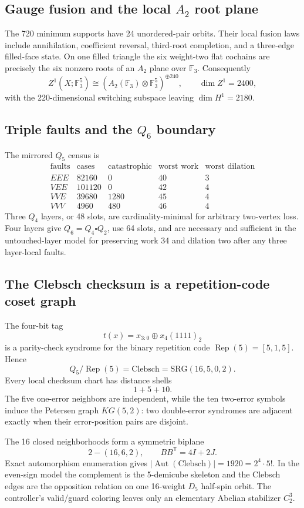 \subsection{Gauge fusion and the local \(A_2\) root plane}
The 720 minimum supports have 24 unordered-pair orbits.  Their local fusion laws
include annihilation, coefficient reversal, third-root completion, and a
three-edge filled-face state.  On one filled triangle the six weight-two flat
cochains are precisely the six nonzero roots of an \(A_2\) plane over
\(\mathbb F_3\).  Consequently
\[
 Z^1(X;\mathbb F_3^5)
 \cong
 \left(A_2(\mathbb F_3)\otimes\mathbb F_3^5\right)^{\oplus240},
 \qquad \dim Z^1=2400,
\]
with the 220-dimensional switching subspace leaving
\(\dim H^1=2180\).

\subsection{Triple faults and the \(Q_6\) boundary}
The mirrored \(Q_5\) census is
\[
\begin{array}{c|r|r|r|r}
\text{faults}&\text{cases}&\text{catastrophic}&\text{worst work}&\text{worst dilation}\\\hline
EEE&82160&0&40&3\\
VEE&101120&0&42&4\\
VVE&39680&1280&45&4\\
VVV&4960&480&46&4
\end{array}
\]
Three \(Q_4\) layers, or 48 slots, are cardinality-minimal for arbitrary
two-vertex loss.  Four layers give \(Q_6=Q_4\square Q_2\), use 64 slots, and
are necessary and sufficient in the untouched-layer model for preserving work
34 and dilation two after any three layer-local faults.

\subsection{The Clebsch checksum is a repetition-code coset graph}
The four-bit tag
\[
 t(x)=x_{3:0}\oplus x_4(1111)_2
\]
is a parity-check syndrome for the binary repetition code
\(\operatorname{Rep}(5)=[5,1,5]\).  Hence
\[
 \boxed{Q_5/\operatorname{Rep}(5)=\mathrm{Clebsch}=\mathrm{SRG}(16,5,0,2)}.
\]
Every local checksum chart has distance shells
\[
 \boxed{1+5+10}.
\]
The five one-error neighbors are independent, while the ten two-error symbols
induce the Petersen graph \(KG(5,2)\): two double-error syndromes are adjacent
exactly when their error-position pairs are disjoint.

The 16 closed neighborhoods form a symmetric biplane
\[
 \boxed{2-(16,6,2)},
 \qquad B B^{\mathsf T}=4I+2J.
\]
Exact automorphism enumeration gives
\(|\operatorname{Aut}(\mathrm{Clebsch})|=1920=2^4\cdot5!\).  In the even-sign
model the complement is the 5-demicube skeleton and the Clebsch edges are the
opposition relation on one 16-weight \(D_5\) half-spin orbit.  The controller's
valid/guard coloring leaves only an elementary Abelian stabilizer \(C_2^3\).

